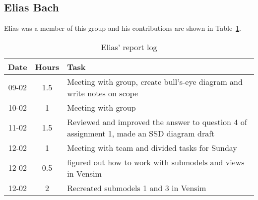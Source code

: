\subsection{Elias Bach}
Elias was a member of this group and his contributions are shown in Table~\ref{tab:elias_log}. 
\begin{longtable}[c]{c|c|m{35em}}
\caption{Elias' report log}
\label{tab:elias_log}\\
\textbf{Date}& \textbf{Hours} & \textbf{Task} \\
\hline
\endfirsthead
%
\endhead
%
09-02 & 1.5 & Meeting with group, create bull's-eye diagram and write notes on scope\\
10-02 & 1 & Meeting with group \\
11-02 & 1.5 & Reviewed and improved the answer to question 4 of assignment 1, made an SSD diagram draft \\
12-02 & 1 & Meeting with team and divided tasks for Sunday\\ 
12-02 & 0.5 & figured out how to work with submodels and views in Vensim \\
12-02 & 2 & Recreated submodels 1 and 3 in Vensim

\end{longtable}